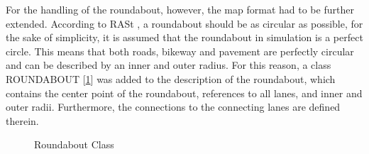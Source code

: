 \documentclass[11pt,oneside,openright]{mpreport}
\begin{document}
For the handling of the roundabout, however, the map format had to be further extended. According to RASt \cite{rast06}, a roundabout should be as circular as possible, 
for the sake of simplicity, it is assumed that the roundabout in simulation is a perfect circle. This means that both roads,
bikeway and pavement are perfectly circular and can be described by an inner and outer radius. For this reason, a class ROUNDABOUT [\cref{roundabout_class}] was added to the description of the roundabout,
which contains the center point of the roundabout, references to all lanes, and inner and outer radii. Furthermore, the connections to the connecting lanes are defined therein.

\begin{figure}[!ht]
\begin{center}
\caption{Roundabout Class}
\label{roundabout_class}
\end{center}
\end{figure}
\end{document}
